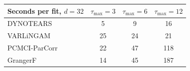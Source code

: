 \begin{tabular}{lccc}
\toprule
Seconds per fit, $d{=}32$ & $\tau_{\max}{=}3$ & $\tau_{\max}{=}6$ & $\tau_{\max}{=}12$ \\
\midrule
DYNOTEARS & 5 & 9 & 16 \\
VARLiNGAM & 25 & 24 & 21 \\
PCMCI-ParCorr & 22 & 47 & 118 \\
GrangerF & 14 & 45 & 187 \\
\bottomrule
\end{tabular}
